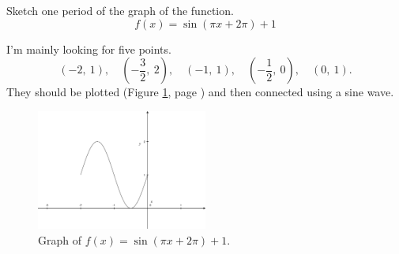 \documentclass[12pt,addpoints, answers, fleqn]{exam}
\begin{document}
\begin{questions}

\question Sketch one period of the graph of the function.
\[
f \left( x \right) = \sin \left( \pi x + 2 \pi \right) + 1
\]
\begin{solution}
I'm mainly looking for five points.
\[
\boxed{\left( -2, \ 1 \right), \quad
\left( -\frac{3}{2}, \ 2 \right), \quad
\left( -1, \ 1 \right), \quad
\left( -\frac{1}{2}, \ 0 \right), \quad
\left( 0, \ 1 \right)}.
\]
They should be plotted (Figure \ref{fig:graph101}, page \pageref{fig:graph101})  and then connected using a sine wave.
\end{solution}
\begin{figure}[h]
   \centering
   \includegraphics[width=0.5\textwidth]{./graphics/graph101.pdf}
   \caption{Graph of $f \left( x \right) = \sin \left( \pi x + 2 \pi \right) + 1$.}
   \label{fig:graph101}
\end{figure}



\end{questions}
\end{document}
